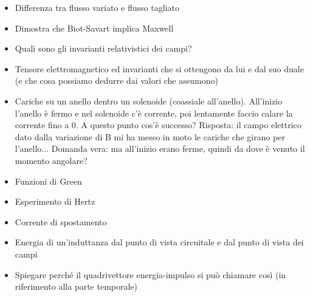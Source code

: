 \documentclass[a4paper,NoNotes,GeneralMath]{stdmdoc}
\begin{document}
\begin{itemize}
		\item Differenza tra flusso variato e flusso tagliato
		\item Dimostra che Biot-Savart implica Maxwell
		\item Quali sono gli invarianti relativistici dei campi?
		\item Tensore elettromagnetico ed invarianti che si ottengono da lui e dal suo duale (e che cosa possiamo dedurre dai valori che assumono)
		\item Cariche su un anello dentro un solenoide (coassiale all'anello). All'inizio l'anello è fermo e nel solenoide c'è corrente, poi lentamente faccio calare la corrente fino a 0. A questo punto cos'è successo? Risposta: il campo elettrico dato dalla variazione di B mi ha messo in moto le cariche che girano per l'anello... Domanda vera: ma all'inizio erano ferme, quindi da dove è venuto il momento angolare?
		\item Funzioni di Green
		\item Esperimento di Hertz
		\item Corrente di spostamento
		\item Energia di un'induttanza dal punto di vista circuitale e dal punto di vista dei campi
		\item Spiegare perché il quadrivettore energia-impulso si può chiamare così (in riferimento alla parte temporale)
	\end{itemize}
\end{document}
